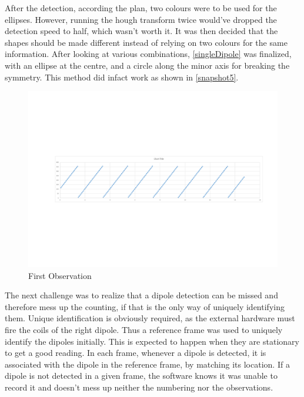 		After the detection, according the plan, two colours were to be used for the ellipses. However, running the hough transform twice would've dropped the detection speed to half, which wasn't worth it. It was then decided that the shapes should be made different instead of relying on two colours for the same information. After looking at various combinations, \autoref{singleDipole} was finalized, with an ellipse at the centre, and a circle along the minor axis for breaking the symmetry. This method did infact work as shown in \autoref{snapshot5}.
		\par

		\begin{figure}[bth]
			\begin{center}
				\includegraphics[width=1.1\linewidth]{../../latticeAnalyser/testGraphs}
			\end{center}
		\caption[First Observation]{First Observation}
		\label{testGraphs}
		\end{figure}

		The next challenge was to realize that a dipole detection can be missed and therefore mess up the counting, if that is the only way of uniquely identifying them. Unique identification is obviously required, as the external hardware must fire the coils of the right dipole. Thus a reference frame was used to uniquely identify the dipoles initially. This is expected to happen when they are stationary to get a good reading. In each frame, whenever a dipole is detected, it is associated with the dipole in the reference frame, by matching its location. If a dipole is not detected in a given frame, the software knows it was unable to record it and doesn't mess up neither the numbering nor the observations.
		\par

